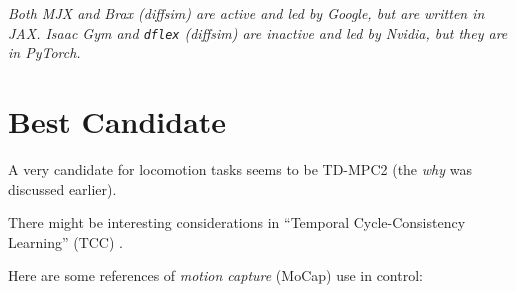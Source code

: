 \documentclass[12pt,a4paper]{article}
\begin{document}
\emph{Both MJX and Brax (diffsim) are active and led by Google, but are written in JAX.
Isaac Gym and \texttt{dflex} (diffsim) are inactive and led by Nvidia, but they are in PyTorch.}

\section{Best Candidate}
\label{s:best}

A very candidate for locomotion tasks seems to be TD-MPC2 \cite{Hansen2024-ld}
(the \emph{why} was discussed earlier).

There might be interesting considerations in
``Temporal Cycle-Consistency Learning'' (TCC) \cite{Dwibedi2019-jv}.

Here are some references of \emph{motion capture} (MoCap) use in control:
\cite{Merel2017-lo, Merel2019-rn, Merel2020-ea, La_Barbera2021-kq, Bohez2022-jt,
Liu2022-lw, Winkler2022-nr, Sun2023-bl, Radosavovic2024-xl}


\end{document}
